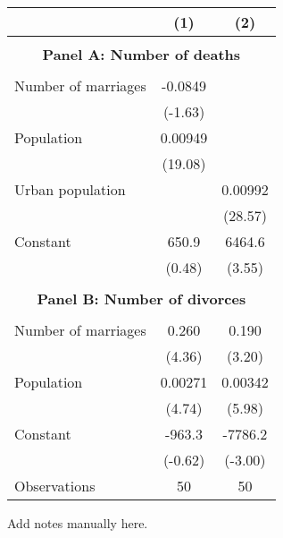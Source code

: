 \begin{tabular}{l*{2}{c}} \hline\hline
                    &\multicolumn{1}{c}{(1)}         &\multicolumn{1}{c}{(2)}         \\
\hline
\\ \multicolumn{3}{c}{\textbf{Panel A: Number of deaths}} \\[-1ex]  &                     &                     \\
[1em]
Number of marriages &     -0.0849         &                     \\
                    &     (-1.63)         &                     \\
[1em]
Population          &     0.00949\sym{***}&                     \\
                    &     (19.08)         &                     \\
[1em]
Urban population    &                     &     0.00992\sym{***}\\
                    &                     &     (28.57)         \\
[1em]
Constant            &       650.9         &      6464.6\sym{***}\\
                    &      (0.48)         &      (3.55)         \\
[1em]
\\ \multicolumn{3}{c}{\textbf{Panel B: Number of divorces}} \\[-1ex]  &                     &                     \\
[1em]
Number of marriages &       0.260\sym{***}&       0.190\sym{**} \\
                    &      (4.36)         &      (3.20)         \\
[1em]
Population          &     0.00271\sym{***}&     0.00342\sym{***}\\
                    &      (4.74)         &      (5.98)         \\
[1em]
Constant            &      -963.3         &     -7786.2\sym{**} \\
                    &     (-0.62)         &     (-3.00)         \\
\hline
Observations        &          50         &          50         \\
\hline\hline \end{tabular} \begin{tablenotes} \footnotesize \item Add notes manually here. \end{tablenotes}
